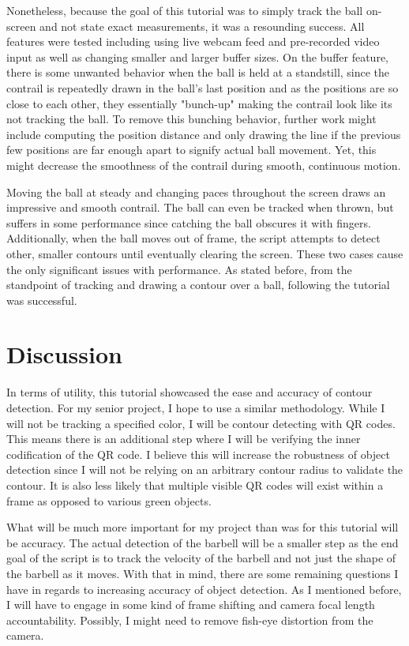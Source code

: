 \documentclass[10pt,twocolumn]{article}
\begin{document}
Nonetheless, because the goal of this tutorial was to simply track the ball on-screen and not state exact measurements, it was a resounding success. 
All features were tested including using live webcam feed and pre-recorded video input as well as changing smaller and larger buffer sizes.
On the buffer feature, there is some unwanted behavior when the ball is held at a standstill, since the contrail is repeatedly drawn in the ball's last position and as the positions are so close to each other, they essentially "bunch-up" making the contrail look like its not tracking the ball.
To remove this bunching behavior, further work might include computing the position distance and only drawing the line if the previous few positions are far enough apart to signify actual ball movement.
Yet, this might decrease the smoothness of the contrail during smooth, continuous motion. \par

Moving the ball at steady and changing paces throughout the screen draws an impressive and smooth contrail.
The ball can even be tracked when thrown, but suffers in some performance since catching the ball obscures it with fingers.
Additionally, when the ball moves out of frame, the script attempts to detect other, smaller contours until eventually clearing the screen.
These two cases cause the only significant issues with performance.
As stated before, from the standpoint of tracking and drawing a contour over a ball, following the tutorial was successful.

\section{Discussion}
In terms of utility, this tutorial showcased the ease and accuracy of contour detection.
For my senior project, I hope to use a similar methodology.
While I will not be tracking a specified color, I will be contour detecting with QR codes.
This means there is an additional step where I will be verifying the inner codification of the QR code.
I believe this will increase the robustness of object detection since I will not be relying on an arbitrary contour radius to validate the contour.
It is also less likely that multiple visible QR codes will exist within a frame as opposed to various green objects.\par

What will be much more important for my project than was for this tutorial will be accuracy.
The actual detection of the barbell will be a smaller step as the end goal of the script is to track the velocity of the barbell and not just the shape of the barbell as it moves.
With that in mind, there are some remaining questions I have in regards to increasing accuracy of object detection.
As I mentioned before, I will have to engage in some kind of frame shifting and camera focal length accountability.
Possibly, I might need to remove fish-eye distortion from the camera. \par
\end{document}
